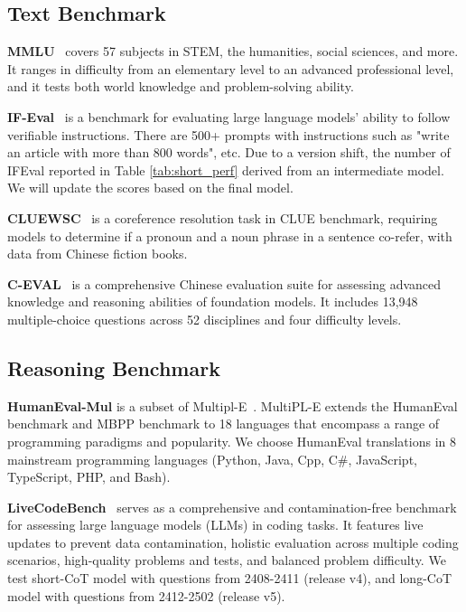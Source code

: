 \documentclass{article}
\newcommand{\citep}[1]{\parencite{#1}}
\begin{document}
\subsection{Text Benchmark}

\textbf{MMLU}~\citep{Hendrycks2020MeasuringMM} covers 57 subjects in STEM, the humanities, social sciences, and more. It ranges in difficulty from an elementary level to an advanced professional level, and it tests both world knowledge and problem-solving ability.


\textbf{IF-Eval}~\citep{Zhou2023InstructionFollowingEF} is a benchmark for evaluating large language models' ability to follow verifiable instructions. There are 500+ prompts with instructions such as "write an article with more than 800 words", etc.
Due to a version shift, the number of IFEval reported in Table \ref{tab:short_perf} derived from an intermediate model. We will update the scores based on the final model.


\textbf{CLUEWSC}~\citep{Xu2020CLUEAC} is a coreference resolution task in CLUE benchmark, requiring models to determine if a pronoun and a noun phrase in a sentence co-refer, with data from Chinese fiction books.

\textbf{C-EVAL}~\citep{Huang2023CEvalAM} is a comprehensive Chinese evaluation suite for assessing advanced knowledge and reasoning abilities of foundation models. It includes 13,948 multiple-choice questions across 52 disciplines and four difficulty levels.


\subsection{Reasoning Benchmark}

\textbf{HumanEval-Mul} is a subset of Multipl-E~\citep{Cassano2022MultiPLEAS}. MultiPL-E extends the HumanEval benchmark and MBPP benchmark to 18 languages that encompass a range of programming paradigms and popularity. We choose HumanEval translations in 8 mainstream programming languages (Python, Java, Cpp, C\#, JavaScript, TypeScript, PHP, and Bash).

\textbf{LiveCodeBench}~\citep{Jain2024LiveCodeBenchHA} serves as a comprehensive and contamination-free benchmark for assessing large language models (LLMs) in coding tasks.  It features live updates to prevent data contamination, holistic evaluation across multiple coding scenarios, high-quality problems and tests, and balanced problem difficulty. We test short-CoT model with questions from 2408-2411 (release v4), and long-CoT model with questions from 2412-2502 (release v5).
\end{document}
